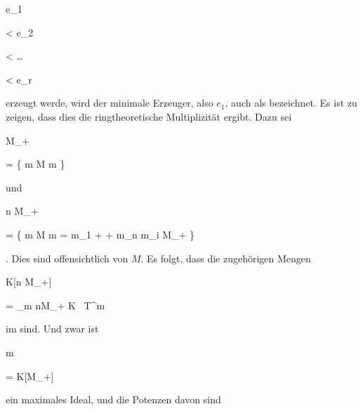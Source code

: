 \mavergleichskette

{\vergleichskette

{ e_1
}

{ < }{ e_2
}

{ < }{ \ldots
}

{ <   }{ e_r
}

{   }{
}

}
{}{}{}
erzeugt werde, wird der minimale Erzeuger, also $e_1$, auch als  {} bezeichnet. Es ist zu zeigen, dass dies die  ringtheoretische Multiplizität ergibt. Dazu sei


\mavergleichskettedisp

{\vergleichskette

{ M_+
}

{ =} { \left\{ m \in M  \mid  m         \right\}
}

{ } {
}

{ } {
}

{ } {
}

}
{}{}{}
und


\mavergleichskettedisp

{\vergleichskette

{ n M_+
}

{ =} { \left\{ m \in M  \mid   {} m = m_1 + \cdots + m_n  m_i \in M_+        \right\}
}

{ } {
}

{ } {
}

{ } {
}

}
{}{}{.}
Dies sind offensichtlich  von $M$. Es folgt, dass die zugehörigen Mengen


\mavergleichskette

{\vergleichskette

{ K[n M_+]
}

{ = }{ \bigoplus_{m \in nM_+} K \, T^m
}

{  }{
}

{    }{
}

{   }{
}

}
{}{}{}
im
sind. Und zwar ist


\mavergleichskette

{\vergleichskette

{{\mathfrak m}
}

{ = }{K[M_+]
}

{  }{
}

{    }{
}

{   }{
}

}
{}{}{}
ein maximales Ideal, und die Potenzen davon sind


